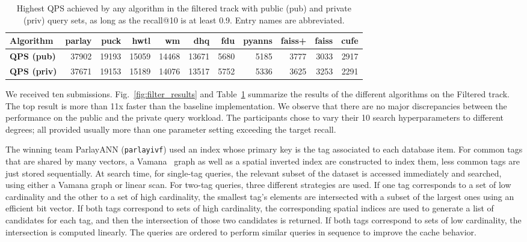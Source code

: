 \begin{table}[t!]
\small
\centering
\begin{tabular}{lrrrrrrrrrr}
\hline
\textbf{Algorithm}     & parlay & puck  & hwtl & wm & dhq   & fdu & pyanns & faiss+ & faiss & cufe \\ \hline
\textbf{QPS (pub)}  & 37902     & 19193 & 15059                   & 14468      & 13671 & 5680             & 5185   & 3777      & 3033  & 2917 \\
\textbf{QPS (priv)} & 37671     & 19153 & 15189                   & 14076      & 13517 & 5752             & 5336   & 3625      & 3253  & 2291 \\ \hline
\end{tabular}
\caption{Highest QPS achieved by any algorithm in the filtered track with public (pub) and private (priv) query sets, as long as the recall@10 is at least 0.9. Entry names are abbreviated.}
\label{tab:filter}
\ifnotarxiv
\vspace*{-20pt}
\fi
\end{table}

We received ten submissions. 
Fig.~\ref{fig:filter_results} and Table~\ref{tab:filter} summarize the results of the different algorithms on the Filtered track.
The top result is more than 11x faster than the baseline implementation. We observe that there are no major discrepancies between the performance on the public and the private query workload. 
The participants chose to vary their 10 search hyperparameters to different degrees; all provided usually more than one parameter setting exceeding the target recall.

The winning team ParlayANN (\texttt{parlayivf}) used an index whose primary key is the tag associated to each database item. 
For common tags that are shared by many vectors, a Vamana~\cite{DiskANN19} graph as well as a spatial inverted index are constructed to index them, less common tags are just stored sequentially. 
At search time, for single-tag queries, the relevant subset of the dataset is accessed immediately and searched, using either a Vamana graph or linear scan. 
For two-tag queries, three different strategies are used. If one tag corresponds to a set of low cardinality and the other to a set of high cardinality, the smallest tag's elements are intersected with a subset of the largest ones using an efficient bit vector. If both tags correspond to sets of high cardinality, the corresponding spatial indices are used to generate a list of candidates for each tag, and then the intersection of those two candidates is returned. If both tags correspond to sets of low cardinality, the intersection is computed linearly.
The queries are ordered to perform similar queries in sequence to improve the cache behavior. 

